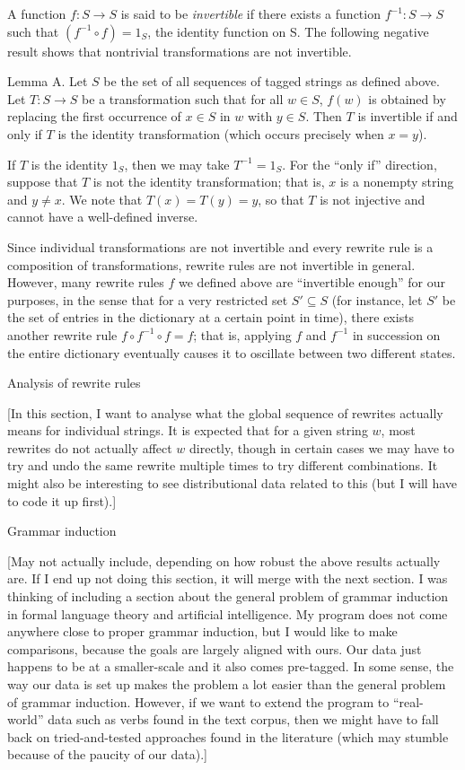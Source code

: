 A function $f : S\to S$ is said to be {\it invertible} if there exists a function $f^{-1}:S\to S$ such that
$(f^{-1}\circ f) = 1_S$, the identity function on S. The following negative result
shows that nontrivial transformations are not invertible.

\proclaim Lemma A. Let $S$ be the set of all sequences of tagged strings as defined above. Let $T: S\to S$
be a transformation such that for all $w\in S$, $f(w)$ is obtained by
replacing the first occurrence of $x\in S$ in $w$ with $y\in S$. Then
$T$ is invertible if and only if $T$ is the identity transformation (which occurs precisely when $x=y$).

\proof If $T$ is the identity $1_S$, then we may take $T^{-1} = 1_S$. For the ``only if'' direction, suppose
that $T$ is not the identity transformation; that is, $x$ is a nonempty string and $y\neq x$. We note that
$T(x) = T(y) = y$, so that $T$ is not injective and cannot have a well-defined inverse.\slug

Since individual transformations are not invertible and every rewrite rule is a composition of transformations,
rewrite rules are not invertible in general. However, many rewrite rules $f$ we defined above are ``invertible
enough'' for our purposes, in the sense that for a very restricted set $S'\subseteq S$ (for instance, let
$S'$ be the set of entries in the dictionary at a certain point in time),
there exists another rewrite rule $f\circ f^{-1} \circ f = f$; that is, applying $f$ and $f^{-1}$ in succession
on the entire dictionary eventually causes it to oscillate between two different states.

\advsect Analysis of rewrite rules

[In this section, I want to analyse what the global sequence of rewrites actually means for individual strings.
It is expected that for a given string $w$, most rewrites do not actually affect $w$ directly, though
in certain cases we may have to try and undo the same rewrite multiple times to try different combinations.
It might also be interesting to see distributional data related to this (but I will have to code it up first).]

\advsect Grammar induction

[May not actually include, depending on how robust the above results actually are. If I end up not
doing this section, it will merge with the next section.
I was thinking of including a section about the general problem of grammar induction in formal language
theory and artificial intelligence.
My program does not come anywhere close to proper grammar induction, but I would
like to make comparisons, because the goals are largely aligned with ours. Our data just happens to be at
a smaller-scale and it also comes pre-tagged. In some sense, the way our data is set up makes the problem
a lot easier than the general problem of grammar induction. However, if we want to extend the program to
``real-world'' data such as verbs found in the text corpus, then we might have to fall back on tried-and-tested
approaches found in the literature (which may stumble because of the paucity of our data).]

